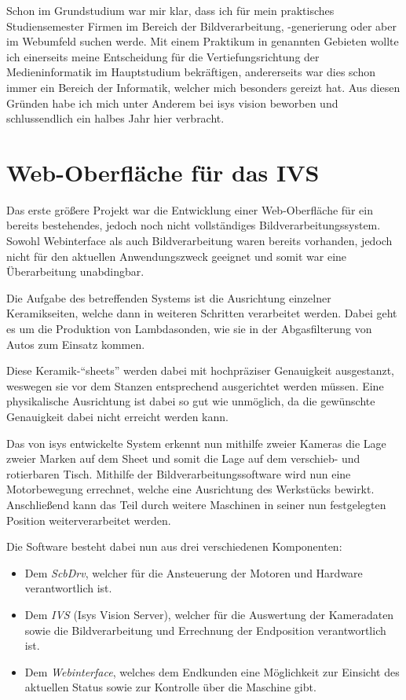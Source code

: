 \documentclass[xcolor=dvipsnames,11pt,paper=a4paper]{report}
\begin{document}
Schon im Grundstudium war mir klar, dass ich für mein praktisches Studiensemester
Firmen im Bereich der Bildverarbeitung, -generierung oder aber im Webumfeld suchen
werde. Mit einem Praktikum in genannten Gebieten wollte ich einerseits meine Entscheidung
für die Vertiefungsrichtung der Medieninformatik im Hauptstudium bekräftigen, andererseits
war dies schon immer ein Bereich der Informatik, welcher mich besonders gereizt
hat. Aus diesen Gründen habe ich mich unter Anderem bei isys vision beworben und
schlussendlich ein halbes Jahr hier verbracht.




\chapter{Web-Oberfläche für das IVS}
\label{ch:ivs}

Das erste größere Projekt war die Entwicklung einer Web-Oberfläche für ein bereits
bestehendes, jedoch noch nicht vollständiges Bildverarbeitungssystem. Sowohl Webinterface
als auch Bildverarbeitung waren bereits vorhanden, jedoch nicht für den aktuellen
Anwendungszweck geeignet und somit war eine Überarbeitung unabdingbar.

Die Aufgabe des betreffenden Systems ist die Ausrichtung einzelner Keramikseiten,
welche dann in weiteren Schritten verarbeitet werden. Dabei geht es um die Produktion
von Lambdasonden, wie sie in der Abgasfilterung von Autos zum Einsatz kommen.

Diese Keramik-``sheets'' werden dabei mit hochpräziser Genauigkeit ausgestanzt,
weswegen sie vor dem Stanzen entsprechend ausgerichtet werden müssen. Eine physikalische
Ausrichtung ist dabei so gut wie unmöglich, da die gewünschte Genauigkeit dabei
nicht erreicht werden kann.

Das von isys entwickelte System erkennt nun mithilfe
zweier Kameras die Lage zweier Marken auf dem Sheet und somit die Lage auf dem verschieb-
und rotierbaren Tisch. Mithilfe der Bildverarbeitungssoftware wird nun eine Motorbewegung
errechnet, welche eine Ausrichtung des Werkstücks bewirkt. Anschließend kann das
Teil durch weitere Maschinen in seiner nun festgelegten Position weiterverarbeitet
werden.

Die Software besteht dabei nun aus drei verschiedenen Komponenten:
\begin{itemize}
	\item Dem \textit{ScbDrv}, welcher für die Ansteuerung der Motoren und Hardware
	verantwortlich ist.
	\item Dem \textit{IVS} (Isys Vision Server), welcher für die Auswertung der Kameradaten
	sowie die Bildverarbeitung und Errechnung der Endposition verantwortlich ist.
	\item Dem \textit{Webinterface}, welches dem Endkunden eine Möglichkeit zur Einsicht
	des aktuellen Status sowie zur Kontrolle über die Maschine gibt.
\end{itemize}
\end{document}
